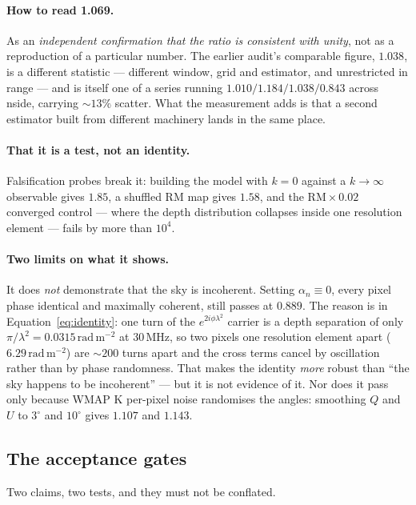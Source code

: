\documentclass[11pt]{article}
\newcommand{\rmu}{\ensuremath{\mathrm{rad\,m^{-2}}}}
\newcommand{\lamsq}{\ensuremath{\lambda^{2}}}
\begin{document}
\paragraph{How to read 1.069.} As an \emph{independent confirmation that
the ratio is consistent with unity}, not as a reproduction of a
particular number. The earlier audit's comparable figure, $1.038$, is a
different statistic --- different window, grid and estimator, and
unrestricted in range --- and is itself one of a series running
$1.010 / 1.184 / 1.038 / 0.843$ across nside, carrying $\sim13\%$
scatter. What the measurement adds is that a second estimator built from
different machinery lands in the same place.

\paragraph{That it is a test, not an identity.} Falsification probes
break it: building the model with $k=0$ against a $k\to\infty$
observable gives $1.85$, a shuffled RM map gives $1.58$, and the
$\mathrm{RM}\times0.02$ converged control --- where the depth
distribution collapses inside one resolution element --- fails by more
than $10^4$.

\paragraph{Two limits on what it shows.} It does \emph{not} demonstrate
that the sky is incoherent. Setting $\alpha_n \equiv 0$, every pixel
phase identical and maximally coherent, still passes at $0.889$. The
reason is in Equation~\eqref{eq:identity}: one turn of the
$e^{2i\phi\lamsq}$ carrier is a depth separation of only
$\pi/\lamsq = 0.0315$\,\rmu{} at 30\,MHz, so two pixels one resolution
element apart ($6.29$\,\rmu) are $\sim\!200$ turns apart and the cross
terms cancel by oscillation rather than by phase randomness. That makes
the identity \emph{more} robust than ``the sky happens to be
incoherent'' --- but it is not evidence of it. Nor does it pass only
because WMAP K per-pixel noise randomises the angles: smoothing $Q$ and
$U$ to $3^\circ$ and $10^\circ$ gives $1.107$ and $1.143$.

\subsection{The acceptance gates}
\label{sec:gates}

Two claims, two tests, and they must not be conflated.
\end{document}

